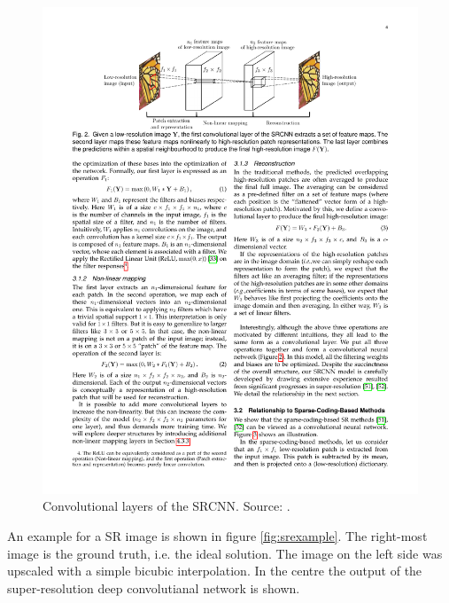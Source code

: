 \documentclass[
			fontsize = 12pt,
			paper = a4
			]
			{scrartcl}%
\newcommand{\?}{\ensuremath{^\texttt{\textbf [CITATION~NEEDED]}}}
\begin{document}
\begin{figure}[H]
    \centering
    \includegraphics[width=\textwidth]{fig/srcnn.pdf}
    \caption{Convolutional layers of the SRCNN. Source: \cite{dong2015image}.}
    \label{fig:SRCNN}
\end{figure}

 An example for a SR image is shown in figure \ref{fig:srexample}. The right-most image is the ground truth, i.e. the ideal solution. The image on the left side was upscaled with a simple bicubic interpolation. In the centre the output of the super-resolution deep convolutianal network is shown.
\end{document}
